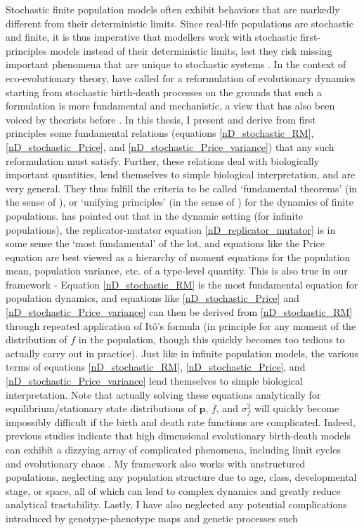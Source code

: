 Stochastic finite population models often exhibit behaviors that are markedly different from their deterministic limits. Since real-life populations are stochastic and finite, it is thus imperative that modellers work with stochastic first-principles models instead of their deterministic limits, lest they risk missing important phenomena that are unique to stochastic systems \citep{black_stochastic_2012,schreiber_does_2022,hastings_transients_2004,shoemaker_integrating_2020}. In the context of eco-evolutionary theory, \cite{doebeli_towards_2017} have called for a reformulation of evolutionary dynamics starting from stochastic birth-death processes on the grounds that such a formulation is more fundamental and mechanistic, a view that has also been voiced by theorists before \citep{metcalf_why_2007,geritz_mathematical_2012}. In this thesis, I present and derive from first principles some fundamental relations (equations \eqref{nD_stochastic_RM}, \eqref{nD_stochastic_Price}, and \eqref{nD_stochastic_Price_variance}) that any such reformulation must satisfy. Further, these relations deal with biologically important quantities, lend themselves to simple biological interpretation, and are very general. They thus fulfill the criteria to be called `fundamental theorems' (in the sense of \cite{queller_fundamental_2017}), or `unifying principles' (in the sense of \cite{lion_theoretical_2018}) for the dynamics of finite populations. \cite{lion_theoretical_2018} has pointed out that in the dynamic setting (for infinite populations), the replicator-mutator equation \eqref{nD_replicator_mutator} is in some sense the `most fundamental' of the lot, and equations like the Price equation are best viewed as a hierarchy of moment equations for the population mean, population variance, etc. of a type-level quantity. This is also true in our framework - Equation \eqref{nD_stochastic_RM} is the most fundamental equation for population dynamics, and equations like \eqref{nD_stochastic_Price} and \eqref{nD_stochastic_Price_variance} can then be derived from \eqref{nD_stochastic_RM} through repeated application of It\^o's formula (in principle for any moment of the distribution of $f$ in the population, though this quickly becomes too tedious to actually carry out in practice). Just like in infinite population models, the various terms of equations \eqref{nD_stochastic_RM}, \eqref{nD_stochastic_Price}, and \eqref{nD_stochastic_Price_variance} lend themselves to simple biological interpretation. Note that actually solving these equations analytically for equilibrium/stationary state distributions of $\mathbf{p}$, $\overline{f}$, and $\sigma^2_f$ will quickly become impossibly difficult if the birth and death rate functions are complicated. Indeed, previous studies indicate that high dimensional evolutionary birth-death models can exhibit a dizzying array of complicated phenomena, including limit cycles and evolutionary chaos \citep{doebeli_diversity_2017}. My framework also works with unstructured populations, neglecting any population structure due to age, class, developmental stage, or space, all of which can lead to complex dynamics and greatly reduce analytical tractability. Lastly, I have also neglected any potential complications introduced by genotype-phenotype maps and genetic processes such 
